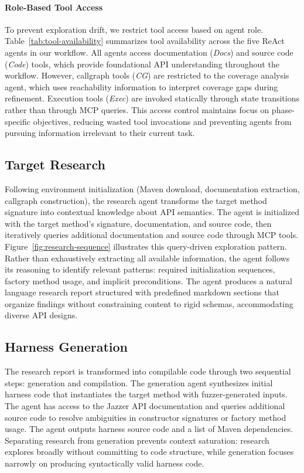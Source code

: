 \paragraph{Role-Based Tool Access}
To prevent exploration drift, we restrict tool access based on agent role. Table~\ref{tab:tool-availability} summarizes tool availability across the five ReAct agents in our workflow. All agents access documentation (\textit{Docs}) and source code (\textit{Code}) tools, which provide foundational API understanding throughout the workflow. However, callgraph tools (\textit{CG}) are restricted to the coverage analysis agent, which uses reachability information to interpret coverage gaps during refinement. Execution tools (\textit{Exec}) are invoked statically through state transitions rather than through MCP queries. This access control maintains focus on phase-specific objectives, reducing wasted tool invocations and preventing agents from pursuing information irrelevant to their current task.


%
\subsection{Target Research}%
\label{subsec:target-research}

Following environment initialization (Maven download, documentation extraction, callgraph construction), the research agent transforms the target method signature into contextual knowledge about API semantics. The agent is initialized with the target method's signature, documentation, and source code, then iteratively queries additional documentation and source code through MCP tools. Figure~\ref{fig:research-sequence} illustrates this query-driven exploration pattern. Rather than exhaustively extracting all available information, the agent follows its reasoning to identify relevant patterns: required initialization sequences, factory method usage, and implicit preconditions. The agent produces a natural language research report structured with predefined markdown sections that organize findings without constraining content to rigid schemas, accommodating diverse API designs.

\subsection{Harness Generation}%
\label{subsec:harness-generation}

The research report is transformed into compilable code through two sequential steps: generation and compilation. The generation agent synthesizes initial harness code that instantiates the target method with fuzzer-generated inputs. The agent has access to the Jazzer API documentation and queries additional source code to resolve ambiguities in constructor signatures or factory method usage. The agent outputs harness source code and a list of Maven dependencies. Separating research from generation prevents context saturation: research explores broadly without committing to code structure, while generation focuses narrowly on producing syntactically valid harness code.

